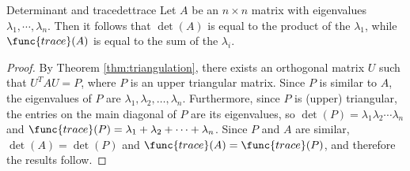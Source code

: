 \begin{corollary}{Determinant and trace}{dettrace}
Let $A$ be an $n \times n$ matrix with eigenvalues $\lambda_1, \cdots, \lambda_n$. Then it follows that $\det(A)$ is equal to the product of the $\lambda_1$, while $\func{trace}(A)$ is equal to the sum of the $\lambda_i$. 
\end{corollary}

\begin{proof}
By Theorem \ref{thm:triangulation}, there exists an orthogonal matrix $U$ such
that $U^TAU=P$, where $P$ is an upper triangular matrix.
Since $P$ is similar to $A$, the eigenvalues
of $P$ are $\lambda_1, \lambda_2, \ldots, \lambda_n$.
Furthermore, since $P$ is (upper) triangular, the entries on the
main diagonal of $P$ are its eigenvalues, so
$\det(P)=\lambda_1 \lambda_2 \cdots \lambda_n$ and
$\func{trace}(P)=\lambda_1 + \lambda_2 + \cdots + \lambda_n$.
Since $P$ and $A$ are similar, $\det(A)=\det(P)$ and $\func{trace}(A)=\func{trace}(P)$,
and therefore the results follow.
\end{proof}
